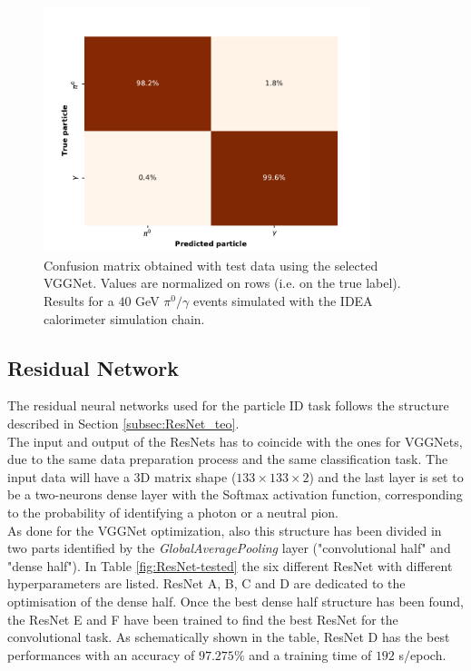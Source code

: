 \begin{figure}
	\centering
	\includegraphics[width=0.85\textwidth]{IMG/Cap6/VGGNet-D_ConfMatrix.pdf}
	\caption{Confusion matrix obtained with test data using the selected VGGNet. Values are normalized on rows (i.e. on the true label). Results for a $40$ GeV $\pi^0/\gamma$ events simulated with the IDEA calorimeter simulation chain.}
	\label{fig:VGGNet-cm}
\end{figure}

\subsection{Residual Network}
The residual neural networks used for the particle ID task follows the structure described in Section \ref{subsec:ResNet_teo}.\\
The input and output of the ResNets has to coincide with the ones for VGGNets, due to the same data preparation process and the same classification task. The input data will have a 3D matrix shape ($133\times 133\times 2$) and the last layer is set to be a two-neurons dense layer with the Softmax activation function, corresponding to the probability of identifying a photon or a neutral pion.\\
As done for the VGGNet optimization, also this structure has been divided in two parts identified by the \textit{GlobalAveragePooling} layer ("convolutional half" and "dense half"). In Table \ref{fig:ResNet-tested} the six different ResNet with different hyperparameters are listed. ResNet A, B, C and D are dedicated to the optimisation of the dense half. Once the best dense half structure has been found, the ResNet E and F have been trained to find the best ResNet for the convolutional task. As schematically shown in the table, ResNet D has the best performances with an accuracy of $97.275\%$ and a training time of $192$ s$/$epoch.\\


